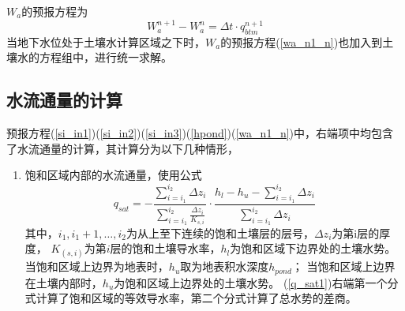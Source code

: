 $W_a$的预报方程为
\begin{equation}\label{wa_n1_n}
W_{a}^{n+1}-W_{a}^{n}=\Delta t \cdot q_{b t m}^{n+1}
\end{equation}
当地下水位处于土壤水计算区域之下时，$W_a$的预报方程(\ref{wa_n1_n})也加入到土壤水的方程组中，进行统一求解。

\subsection{水流通量的计算}
预报方程(\ref{si_in1})(\ref{si_in2})(\ref{si_in3})(\ref{hpond})(\ref{wa_n1_n})中，右端项中均包含了水流通量的计算，其计算分为以下几种情形，
\begin{enumerate}
    \item 饱和区域内部的水流通量，使用公式
    \begin{equation}\label{q_sat1}
        q_{sat}=-\frac{\sum_{i=i_{1}}^{i_{2}} \Delta z_{i}}{\sum_{i=i_{1}}^{i_{2}} \frac{\Delta z_{i}}{K_{s, i}}}
         \cdot \frac{h_{l}-h_{u}-\sum_{i=i_{1}}^{i_{2}} \Delta z_{i}}{\sum_{i=i_{1}}^{i_{2}} \Delta z_{i}}
        \end{equation}
        其中，$i_1,i_1+1,…,i_2$为从上至下连续的饱和土壤层的层号，$\Delta z_i$为第i层的厚度，
        $K_(s,i)$为第$i$层的饱和土壤导水率，$h_l$为饱和区域下边界处的土壤水势。
        当饱和区域上边界为地表时，$h_u$取为地表积水深度$h_{pond}$；
        当饱和区域上边界在土壤内部时，$h_u$为饱和区域上边界处的土壤水势。
        (\ref{q_sat1})右端第一个分式计算了饱和区域的等效导水率，第二个分式计算了总水势的差商。


\end{enumerate}
